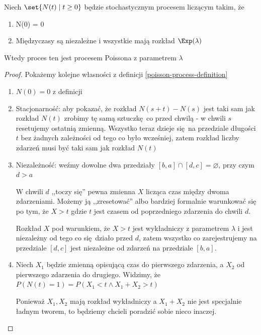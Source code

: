 \begin{theorem}[Twierdzenie 8.11 P\&C]
	Niech \(\set{N(t) \mid t \geq 0}\) będzie stochastycznym procesem liczącym takim, że
	\begin{enumerate}
		\item N(0) = 0
		\item Międzyczasy są niezależne i wszystkie mają rozkład \(\Exp(\lambda)\)
	\end{enumerate}
	Wtedy proces ten jest procesem Poissona z parametrem \( \lambda \)
\end{theorem}
\begin{proof}
	Pokażemy kolejne własności z definicji \ref{poisson-process-definition}

	\begin{enumerate}
		\item \( N(0) = 0 \) z definicji

		\item[2a.] Stacjonarność: aby pokazać, że rozkład \( N(s + t) - N(s) \) jest taki sam jak rozkład \( N(t) \) zrobimy tę samą sztuczkę co przed chwilą - w chwili \( s \) resetujemy ostatnią zmienną. Wszystko teraz dzieje się na przedziale długości \( t \) bez żadnych zależności od tego co było wcześniej, zatem rozkład liczby zdarzeń musi być taki sam jak rozkład \( N(t) \)

		\item[2b.] Niezależność: weźmy dowolne dwa przedziały \( [b, a] \cap [d, c] = \varnothing \), przy czym \( d > a \)

		      W chwili \( d \) ,,toczy się'' pewna zmienna \( X \) licząca czas między dwoma zdarzeniami.
		      Możemy ją ,,zresetować'' albo bardziej formalnie warunkować się po tym, że \( X > t \) gdzie \( t \) jest czasem od poprzedniego zdarzenia do chwili \( d \).

		      Rozkład \( X \) pod warunkiem, że \( X > t \) jest wykładniczy z parametrem \( \lambda \) i jest niezależny od tego co się działo przed \( d \), zatem wszystko co zarejestrujemy na przedziale \( [d, c] \) jest niezależne od zdarzeń na przedziale \( [b, a] \).

		      \setcounter{enumi}{2}
		\item Niech \( X_1 \) będzie zmienną opisującą czas do pierwszego zdarzenia, a \( X_2 \) od pierwszego zdarzenia do drugiego. Widzimy, że \( P(N(t) = 1) = P(X_1 < t \land X_1 + X_2 > t) \)

		      Ponieważ \( X_1, X_2 \) mają rozkład wykładniczy a \( X_1 + X_2 \) nie jest specjalnie ładnym tworem, to będziemy chcieli poradzić sobie nieco inaczej.


\end{enumerate}
\end{proof}

